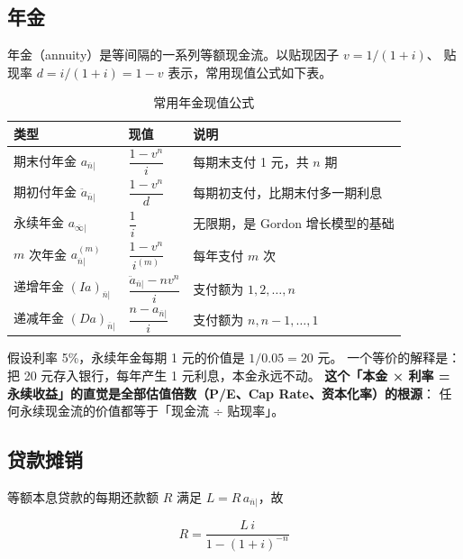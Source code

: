 \subsection{年金}

年金（annuity）是等间隔的一系列等额现金流。以贴现因子 $v = 1/(1+i)$、
贴现率 $d = i/(1+i) = 1-v$ 表示，常用现值公式如下表。

\begin{table}[htbp]
\centering
\caption{常用年金现值公式}\label{tab:05-annuity}
\tablefont
\begin{tabularx}{\textwidth}{@{}L{3.4cm}L{4.6cm}Y@{}}
\toprule
\textbf{类型} & \textbf{现值} & \textbf{说明} \\
\midrule
期末付年金 $a_{\overline{n}|}$ & $\dfrac{1-v^{n}}{i}$ & 每期末支付 1 元，共 $n$ 期 \\
期初付年金 $\ddot{a}_{\overline{n}|}$ & $\dfrac{1-v^{n}}{d}$ & 每期初支付，比期末付多一期利息 \\
永续年金 $a_{\overline{\infty}|}$ & $\dfrac{1}{i}$ & 无限期，是 Gordon 增长模型的基础 \\
$m$ 次年金 $a_{\overline{n}|}^{(m)}$ & $\dfrac{1-v^{n}}{i^{(m)}}$ & 每年支付 $m$ 次 \\
递增年金 $(Ia)_{\overline{n}|}$ & $\dfrac{\ddot{a}_{\overline{n}|}-nv^{n}}{i}$ & 支付额为 $1,2,\dots,n$ \\
递减年金 $(Da)_{\overline{n}|}$ & $\dfrac{n-a_{\overline{n}|}}{i}$ & 支付额为 $n,n-1,\dots,1$ \\
\bottomrule
\end{tabularx}
\end{table}

\begin{intuitionbox}[永续年金为什么是 $1/i$]
假设利率 5\%，永续年金每期 1 元的价值是 $1/0.05 = 20$ 元。
一个等价的解释是：把 20 元存入银行，每年产生 1 元利息，本金永远不动。
\textbf{这个「本金 × 利率 = 永续收益」的直觉是全部估值倍数（P/E、Cap Rate、资本化率）的根源}：
任何永续现金流的价值都等于「现金流 ÷ 贴现率」。
\end{intuitionbox}

\subsection{贷款摊销}

等额本息贷款的每期还款额 $R$ 满足 $L = R\,a_{\overline{n}|}$，故

\begin{equation}
  R = \frac{L\,i}{1-(1+i)^{-n}}
  \label{eq:05-amort}
\end{equation}

